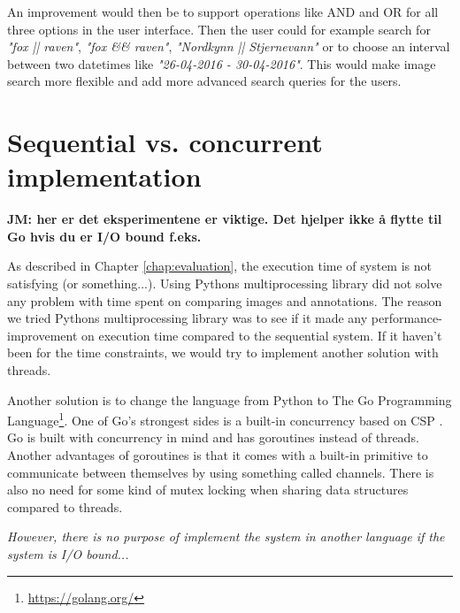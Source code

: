 \documentclass[USenglish]{uit-thesis}
\begin{document}
An improvement would then be to support operations like AND and OR for all three options in the user interface.
Then the user could for example search for \textit{"fox || raven"}, \textit{"fox \&\& raven"}, \textit{"Nordkynn || Stjernevann"} or to choose an interval between two datetimes like \textit{"26-04-2016 - 30-04-2016"}. This would make image search more flexible and add more advanced search queries for the users.

\section{Sequential vs. concurrent implementation} \label{sec:disc_concurrent}
\textbf{JM: her er det eksperimentene er viktige. Det hjelper ikke å flytte til Go hvis du er I/O bound f.eks.}

As described in Chapter \ref{chap:evaluation}, the execution time of system is not satisfying (or something...). Using Pythons multiprocessing library did not solve any problem with time spent on comparing images and annotations. The reason we tried Pythons multiprocessing library was to see if it made any performance-improvement on execution time compared to the sequential system. If it haven't been for the time constraints, we would try to implement another solution with threads.

Another solution is to change the language from Python to The Go Programming Language\footnote{\url{https://golang.org/}}. One of Go's strongest sides is a built-in concurrency based on CSP \cite{hoare}. Go is built with concurrency in mind and has goroutines instead of threads. Another advantages of goroutines is that it comes with a built-in primitive to communicate between themselves by using something called channels. There is also no need for some kind of mutex locking when sharing data structures compared to threads.

\textit{However, there is no purpose of implement the system in another language if the system is I/O bound...}

\end{document}
